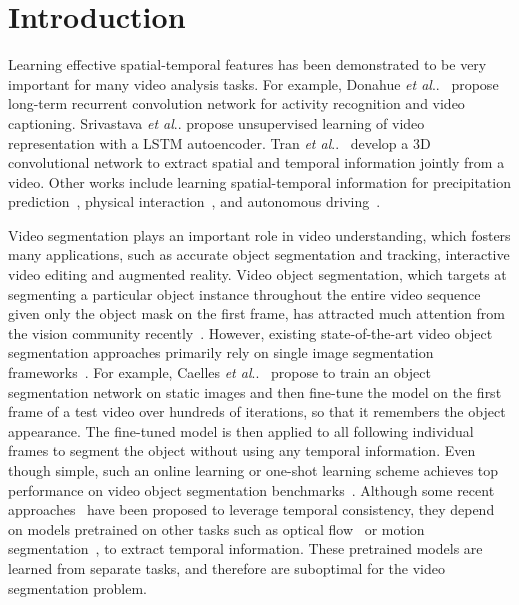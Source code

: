 \documentclass[runningheads]{llncs}
\makeatletter
\DeclareRobustCommand\onedot{\futurelet\@let@token\@onedot}
\def\@onedot{\ifx\@let@token.\else.\null\fi\xspace}
\def\etal{\emph{et al}\onedot}
\makeatother
\begin{document}
\section{Introduction}

Learning effective spatial-temporal features has been demonstrated to be very important for many video analysis tasks. For example, Donahue \etal~\cite{donahue2015rcn} propose long-term recurrent convolution network for activity recognition and video captioning. Srivastava \etal\cite{srivastava2015unsupervisedlstm} propose unsupervised learning of video representation with a LSTM autoencoder. Tran \etal~\cite{tran2015c3d} develop a 3D convolutional network to extract spatial and temporal information jointly from a video. Other works include learning spatial-temporal information for precipitation prediction~\cite{xingjian2015convolutional}, physical interaction~\cite{finn2016videopred}, and autonomous driving~\cite{xu2016driving}. 

Video segmentation plays an important role in video understanding, which fosters many applications, such as accurate object segmentation and tracking, interactive video editing and augmented reality. Video object segmentation, which targets at segmenting a particular object instance throughout the entire video sequence given only the object mask on the first frame, has attracted much attention from the vision community recently~\cite{Caelles2017osvos,Perazzi2017masktrack,Yang2018osmn,Cheng2017segflow,Jain_2017_CVPR,Jampani2017vpn,Tokmakov2017memory,Hu2017Maskrnn,voigtlaender2017online}. However, existing state-of-the-art video object segmentation approaches primarily rely on single image segmentation frameworks~\cite{Caelles2017osvos,Perazzi2017masktrack,Yang2018osmn,voigtlaender2017online}. For example, Caelles \etal~\cite{Caelles2017osvos} propose to train an object segmentation network on static images and then fine-tune the model on the first frame of a test video over hundreds of iterations, so that it remembers the object appearance. The fine-tuned model is then applied to all following individual frames to segment the object without using any temporal information. Even though simple, such an online learning or one-shot learning scheme achieves top performance on video object segmentation benchmarks~\cite{Perazzi2016davis,Jain2014youtubeobjects}. Although some recent approaches~\cite{Jain_2017_CVPR,Cheng2017segflow,Tokmakov2017memory} have been proposed to leverage temporal consistency, they depend on models pretrained on other tasks such as optical flow~\cite{Ilg2017flownet,Revaud2015epicflow} or motion segmentation~\cite{Tokmakov2017mpnet}, to extract temporal information. These pretrained models are learned from separate tasks, and therefore are suboptimal for the video segmentation problem.
\end{document}
